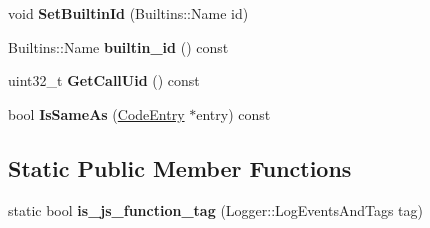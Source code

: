 \begin{DoxyCompactItemize}
\item 
\hypertarget{classv8_1_1internal_1_1_code_entry_a059bc6a8c10ba7ef846f7c11b592784d}{}void {\bfseries Set\+Builtin\+Id} (Builtins\+::\+Name id)\label{classv8_1_1internal_1_1_code_entry_a059bc6a8c10ba7ef846f7c11b592784d}

\item 
\hypertarget{classv8_1_1internal_1_1_code_entry_a5be3a3fbdfd5d1e972f4a1d49a7034b6}{}Builtins\+::\+Name {\bfseries builtin\+\_\+id} () const \label{classv8_1_1internal_1_1_code_entry_a5be3a3fbdfd5d1e972f4a1d49a7034b6}

\item 
\hypertarget{classv8_1_1internal_1_1_code_entry_a759e71055edb59c571461abdf56fbbc9}{}uint32\+\_\+t {\bfseries Get\+Call\+Uid} () const \label{classv8_1_1internal_1_1_code_entry_a759e71055edb59c571461abdf56fbbc9}

\item 
\hypertarget{classv8_1_1internal_1_1_code_entry_ad95d09ee3fa5039bdde137ff7e4e6db5}{}bool {\bfseries Is\+Same\+As} (\hyperlink{classv8_1_1internal_1_1_code_entry}{Code\+Entry} $\ast$entry) const \label{classv8_1_1internal_1_1_code_entry_ad95d09ee3fa5039bdde137ff7e4e6db5}

\end{DoxyCompactItemize}
\subsection*{Static Public Member Functions}
\begin{DoxyCompactItemize}
\item 
\hypertarget{classv8_1_1internal_1_1_code_entry_a89f5494f717285be1380d65dbb17a214}{}static bool {\bfseries is\+\_\+js\+\_\+function\+\_\+tag} (Logger\+::\+Log\+Events\+And\+Tags tag)\label{classv8_1_1internal_1_1_code_entry_a89f5494f717285be1380d65dbb17a214}

\end{DoxyCompactItemize}
